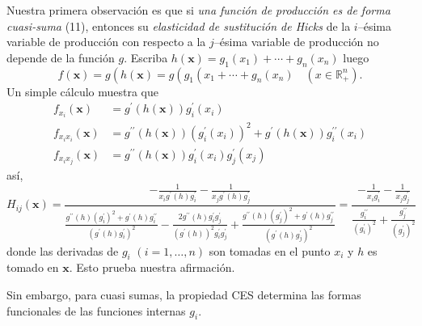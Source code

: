 \documentclass[a4paper,fleqn]{cas-dc}
\begin{document}
Nuestra primera observación es que si \emph{una función de producción es de forma cuasi-suma} (11), entonces su \emph{elasticidad de sustitución de Hicks} de la $i$--ésima variable de producción con respecto a la $j$--ésima variable de producción no depende de la función $g$. Escriba $h\left(\bm{x}\right)=g_{1}\left(x_{1}\right)+\cdots+g_{n}\left(x_{n}\right)$ luego \[ f\left(\bm{x}\right)=g\left(h\left(\bm{x}\right)=g\left(g_{1}\left(x_{1}+\cdots+g_{n}\left(x_{n}\right)\quad\left(x\in\mathds{R}^{n}_{+}\right). \] Un simple cálculo muestra que
\begin{align*}
f_{x_{i}}\left(\bm{x}\right)
&=g^{\prime}\left(h\left(\bm{x}\right)\right)g^{\prime}_{i}\left(x_{i}\right)\\
f_{x_{i}x_{i}}\left(\bm{x}\right)
&=g^{\prime\prime}\left(h\left(\bm{x}\right)\right){\left(g^{\prime}_{i}\left(x_{i}\right)\right)}^{2}+g^{\prime}\left(h\left(\bm{x}\right)\right)g^{\prime\prime}_{i}\left(x_{i}\right)\\
f_{x_{i}x_{j}}\left(\bm{x}\right)
&=g^{\prime\prime}\left(h\left(\bm{x}\right)\right)g^{\prime}_{i}\left(x_{i}\right)g^{\prime}_{j}\left(x_{j}\right)
\end{align*}
así,
\begin{equation}
H_{ij}\left(\bm{x}\right)
=\frac{-\frac{1}{x_{i}g^{\prime}\left(h\right)g^{\prime}_{i}}-\frac{1}{x_{j}g^{\prime}\left(h\right)g^{\prime}_{j}}}
{\frac{g^{\prime\prime}\left(h\right){\left(g^{\prime}_{i}\right)}^{2}+g^{\prime}\left(h\right)g^{\prime\prime}_{i}}{{\left(g^{\prime}\left(h\right)g^{\prime}_{i}\right)}^{2}}-\frac{2g^{\prime\prime}\left(h\right)g^{\prime}_{i}g^{\prime}_{j}}{{\left(g^{\prime}\left(h\right)\right)}^{2}g^{\prime}_{i}g^{\prime}_{j}}+\frac{g^{\prime\prime}\left(h\right){\left(g^{\prime}_{j}\right)}^{2}+g^{\prime}\left(h\right)g^{\prime\prime}_{j}}{{\left(g^{\prime}\left(h\right)g^{\prime}_{j}\right)}^{2}}}
=\frac{-\frac{1}{x_{i}g^{\prime}_{i}}-\frac{1}{x_{j}g^{\prime}_{j}}}{\frac{g^{\prime\prime}_{i}}{{\left(g^{\prime}_{i}\right)}^{2}}+\frac{g^{\prime\prime}_{j}}{{\left(g^{\prime}_{j}\right)}^{2}}}
\end{equation}
donde las derivadas de $g_{i}$ $(i=1,\ldots,n)$ son tomadas en el punto $x_{i}$ y $h$ es tomado en $\bm{x}$. Esto prueba nuestra afirmación.

Sin embargo, para cuasi sumas, la propiedad CES determina las formas funcionales de las funciones internas $g_{i}$.
\end{document}
